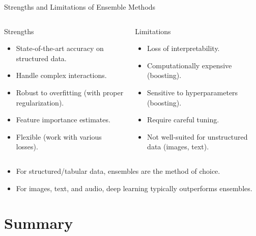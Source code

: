 \begin{frame}{Strengths and Limitations of Ensemble Methods}
  \begin{columns}[t]
      \begin{block}{Strengths}
        \begin{itemize}
          \item \alert{State-of-the-art accuracy} on structured data.
          \item Handle complex interactions.
          \item Robust to overfitting (with proper regularization).
          \item Feature importance estimates.
          \item Flexible (work with various losses).
        \end{itemize}
      \end{block}
      \begin{block}{Limitations}
        \begin{itemize}
          \item Loss of interpretability.
          \item Computationally expensive (boosting).
          \item Sensitive to hyperparameters (boosting).
          \item Require careful tuning.
          \item Not well-suited for unstructured data (images, text).
        \end{itemize}
      \end{block}
  \end{columns}
  \vspace{0.6em}
  \begin{itemize}
    \item For structured/tabular data, ensembles are the \alert{method of choice}.
    \item For images, text, and audio, deep learning typically outperforms ensembles.
  \end{itemize}
\end{frame}

\section{Summary}

